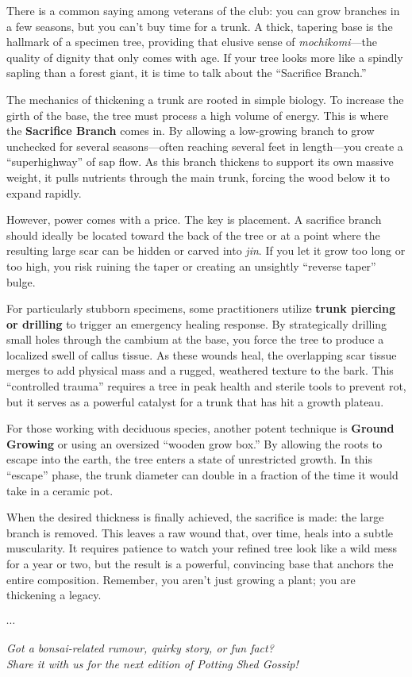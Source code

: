\label{2026-01-gossip}
\noindent
There is a common saying among veterans of the club: you can grow branches in a few seasons, but you can't buy time for a trunk.
A thick, tapering base is the hallmark of a specimen tree, providing that elusive sense of \textit{mochikomi}---the quality of dignity that only comes with age.
If your tree looks more like a spindly sapling than a forest giant, it is time to talk about the ``Sacrifice Branch.''

The mechanics of thickening a trunk are rooted in simple biology.
To increase the girth of the base, the tree must process a high volume of energy.
This is where the \textbf{Sacrifice Branch} comes in.
By allowing a low\--growing branch to grow unchecked for several seasons---often reaching several feet in length---you create a ``superhighway'' of sap flow.
As this branch thickens to support its own massive weight, it pulls nutrients through the main trunk, forcing the wood below it to expand rapidly.

However, power comes with a price.
The key is placement.
A sacrifice branch should ideally be located toward the back of the tree or at a point where the resulting large scar can be hidden or carved into \textit{jin}.
If you let it grow too long or too high, you risk ruining the taper or creating an unsightly ``reverse taper'' bulge.

For particularly stubborn specimens, some practitioners utilize \textbf{trunk piercing or drilling} to trigger an emergency healing response.
By strategically drilling small holes through the cambium at the base, you force the tree to produce a localized swell of callus tissue.
As these wounds heal, the overlapping scar tissue merges to add physical mass and a rugged, weathered texture to the bark.
This ``controlled trauma'' requires a tree in peak health and sterile tools to prevent rot, but it serves as a powerful catalyst for a trunk that has hit a growth plateau.

For those working with deciduous species, another potent technique is \textbf{Ground Growing} or using an oversized ``wooden grow box.''
By allowing the roots to escape into the earth, the tree enters a state of unrestricted growth.
In this ``escape'' phase, the trunk diameter can double in a fraction of the time it would take in a ceramic pot.

When the desired thickness is finally achieved, the sacrifice is made: the large branch is removed.
This leaves a raw wound that, over time, heals into a subtle muscularity.
It requires patience to watch your refined tree look like a wild mess for a year or two, but the result is a powerful, convincing base that anchors the entire composition.
Remember, you aren't just growing a plant; you are thickening a legacy.

\vfill
\begin{center}$\cdots$\end{center}

\noindent
\textit{Got a bonsai\--related rumour, quirky story, or fun fact?}\\
\textit{Share it with us for the next edition of \textit{Potting Shed Gossip}!}
\closearticle
\clearpage
